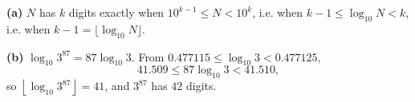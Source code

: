 \textbf{(a)} $N$ has $k$ digits exactly when $10^{k-1}\le N<10^k$, i.e. when $k-1\le\log_{10}N<k$, i.e. when $k-1=\lfloor\log_{10}N\rfloor$.

\textbf{(b)} $\log_{10}3^{87}=87\log_{10}3$. From $0.477115\le\log_{10}3<0.477125$,
\[41.509\le87\log_{10}3<41.510,\]
so $\left\lfloor\log_{10}3^{87}\right\rfloor=41$, and $3^{87}$ has $\boxed{42}$ digits.
